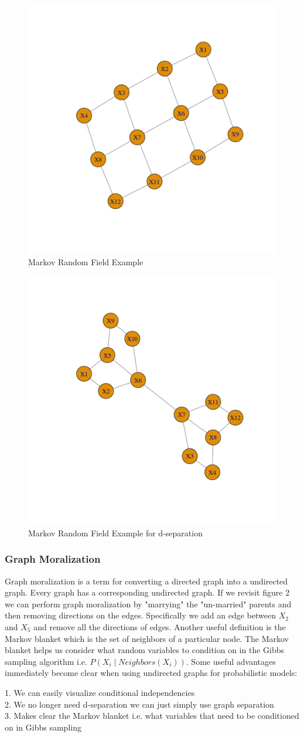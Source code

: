 \documentclass[12pt]{report}
\begin{document}
\begin{figure}[h!]
\centering
\includegraphics[width=.38\textwidth]{figures/lec17_graph3.png} 
\caption{Markov Random Field Example} 
\end{figure} 

\begin{figure}[h!]
\centering
\includegraphics[width=.38\textwidth]{figures/lec17_graph4.png} 
\caption{Markov Random Field Example for d-separation} 
\end{figure} 

\newpage
\subsubsection*{Graph Moralization}

Graph moralization is a term for converting a directed graph into a undirected graph. Every graph has a corresponding undirected graph. If we revisit figure 2 we can perform graph moralization by "marrying" the "un-married" parents and then removing directions on the edges. Specifically we add an edge between $X_2$ and $X_5$ and remove all the directions of edges. Another useful definition is the Markov blanket which is the set of neighbors of a particular node. The Markov blanket helps us consider what random variables to condition on in the Gibbs sampling algorithm i.e. $P(X_i \mid Neighbors(X_i))$. Some useful advantages immediately become clear when using undirected graphs for probabilistic models:

1. We can easily visualize conditional independencies\\ 
2. We no longer need d-separation we can just simply use graph separation\\
3. Makes clear the Markov blanket i.e. what variables that need to be conditioned on in Gibbs sampling
\end{document}
